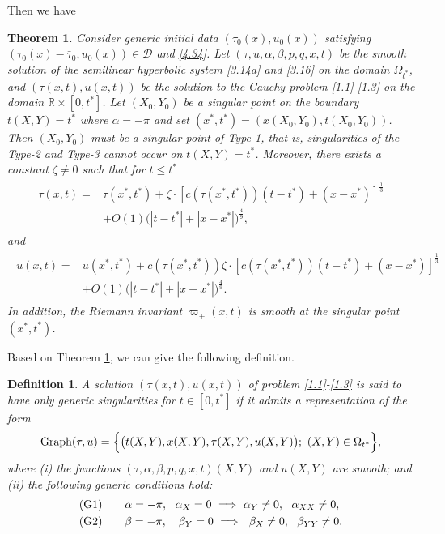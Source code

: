 \documentclass[11pt,reqno]{article}
\newtheorem{thm}{Theorem}
\newtheorem{defn}{Definition}
\newcommand{\fr}{\frac}
\numberwithin{equation}{section}
\begin{document}
Then we have
\begin{thm}\label{thm2}
Consider generic initial data $(\tau_0(x), u_0(x))$ satisfying $(\tau_0(x)-\bar{\tau}_0, u_0(x))\in \mathcal{D}$ and \eqref{4.34}.
Let $(\tau, u, \alpha, \beta, p, q, x, t)$ be the smooth solution of the semilinear hyperbolic system \eqref{3.14a} and \eqref{3.16} on the domain $\Omega_{t^*}$, and $(\tau(x,t), u(x,t))$ be the solution to the Cauchy problem \eqref{1.1}-\eqref{1.3} on the domain $\mathbb{R}\times[0, t^*]$. Let $(X_0, Y_0)$ be a singular point on the boundary $t(X,Y)=t^*$ where $\alpha=-\pi$ and set $(x^*,t^*)=(x(X_0, Y_0), t(X_0, Y_0))$. Then $(X_0, Y_0)$ must be a singular point of Type-1, that is, singularities of the Type-2 and Type-3 cannot occur on $t(X,Y)=t^*$. Moreover, there exists a constant $\zeta\neq0$ such that for $t\leq t^*$
\begin{align}\label{5.1a}
\begin{split}
\tau(x,t)=&\tau(x^*,t^*) +\zeta\cdot [c(\tau(x^*,t^*))(t-t^*)+(x-x^*)]^{\fr{1}{3}} \\ &+O(1)\Big(|t-t^*|+|x-x^*|\Big)^{\fr{4}{9}},
\end{split}
\end{align}
and
\begin{align}\label{5.1aa}
\begin{split}
u(x,t)=&u(x^*,t^*) +c(\tau(x^*, t^*))\zeta\cdot [c(\tau(x^*,t^*))(t-t^*)+(x-x^*)]^{\fr{1}{3}} \\ &+O(1)\Big(|t-t^*|+|x-x^*|\Big)^{\fr{4}{9}}.
\end{split}
\end{align}
In addition, the Riemann invariant $\varpi_+(x,t)$ is smooth at the singular point $(x^*, t^*)$.
\end{thm}




Based on Theorem \ref{thm2}, we can give the following definition.
\begin{defn}\label{def1}
A solution $(\tau(x,t), u(x,t))$ of problem \eqref{1.1}-\eqref{1.3} is said to have only generic singularities for $t\in[0,t^*]$ if it admits a representation of the form
\begin{align}\label{5.1b}
\begin{split}
{\rm Graph}(\tau, u)=\Big\{\big(t(X,Y), x(X,Y),\tau(X,Y), u(X,Y)\big);\ (X,Y)\in \Omega_{t^*}\Big\},
\end{split}
\end{align}
where (i) the functions $(\tau, \alpha, \beta, p, q, x, t)(X,Y)$ and $u(X,Y)$ are smooth; and (ii) the following generic conditions hold:
\begin{align}\label{5.1c}
\begin{split}
{\rm(G1)}&\qquad \alpha=-\pi,\ \ \alpha_X=0\ \Longrightarrow \ \alpha_Y\neq0,\ \ \alpha_{XX}\neq0,\\
{\rm(G2)}&\qquad \beta=-\pi,\ \ \ \beta_Y=0\   \Longrightarrow \ \ \beta_X\neq0,\ \ \beta_{YY}\neq0.
\end{split}
\end{align}
\end{defn}
\end{document}

